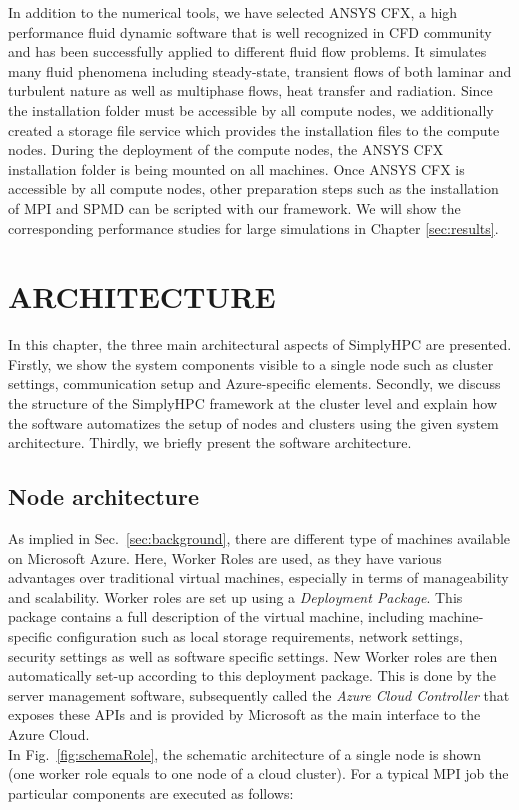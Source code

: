 \documentclass[a4paper,twoside]{article}
\begin{document}
In addition to the numerical tools, we have selected ANSYS CFX, a high performance fluid dynamic software that is well recognized in CFD community and has been successfully applied to different fluid flow problems. It simulates many fluid phenomena including steady-state, transient flows of both laminar and turbulent nature as well as multiphase flows, heat transfer and radiation. Since the installation folder must be accessible by all compute nodes, we additionally created a storage file service which provides the installation files to the compute nodes. During the deployment of the compute nodes, the ANSYS CFX installation folder is being mounted on all machines. Once ANSYS CFX is accessible by all compute nodes, other preparation steps such as the installation of MPI and SPMD can be scripted with our framework. We will show the corresponding performance studies for large simulations in Chapter \ref{sec:results}.

\section{\uppercase{Architecture}}

\label{sec:architecture}
In this chapter, the three main architectural aspects of SimplyHPC are presented. Firstly, we show the system components visible to a single node such as cluster settings, communication setup and Azure-specific elements. Secondly, we discuss the structure of the SimplyHPC framework at the cluster level and explain how the software automatizes the setup of nodes and clusters using the given system architecture. Thirdly, we briefly present the software architecture.

\subsection{Node architecture}

As implied in Sec.~\ref{sec:background}, there are different type of machines available on Microsoft Azure. Here, Worker Roles are used, as they have various advantages over traditional virtual machines, especially in terms of manageability and scalability. 
Worker roles are set up using a \textit{Deployment Package}. This package contains a full description of the virtual machine, including machine-specific configuration such as local storage requirements, network settings, security settings as well as software specific settings. New Worker roles are then automatically set-up according to this deployment package. This is done by the server management software, subsequently called the \textit{Azure Cloud Controller} that exposes these APIs and is provided by Microsoft as the main interface to the Azure Cloud. \\
In Fig.~\ref{fig:schemaRole}, the schematic architecture of a single node is shown (one worker role equals to one node of a cloud cluster). For a typical MPI job the particular components are executed as follows: 
\end{document}
